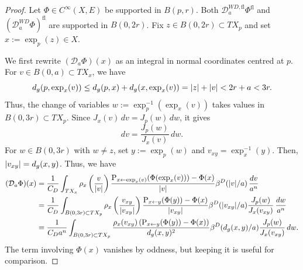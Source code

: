 \documentclass[a4paper,oneside,12pt]{amsart}
\theoremstyle{plain}
\theoremstyle{definition}
\theoremstyle{remark}
\DeclarePairedDelimiter{\abs}{\lvert}{\rvert}
\newcommand{\paralleltransport}[2]{\operatorname{P}_{#2 \gets #1}}
\newcommand{\cliffordmultiplication}{\rho}
\newcommand{\mesoscopicDiracoperator}[1][a]{\mathcal{D}_{#1}}
\newcommand{\mesoscopicWilsonDiracoperator}[1][a]{\mathcal{D}_{#1}^{\mathit{WD}}}
\newcommand{\cutoff}{\beta}
\newcommand{\cutoffDirac}{\cutoff^D}
\newcommand{\flatmesoscopicWilsonDiracoperator}[1][a]{\mathcal{D}_{#1}^{\mathit{WD},\mathrm{fl}}}
\newcommand{\flatmodel}[1]{#1^{\mathrm{fl}}}
\begin{document}
\begin{proof}
  Let $\Phi \in C^{\infty}(X,E)$ be supported in $B(p,r)$.
  Both $\flatmesoscopicWilsonDiracoperator \flatmodel{\Phi}$ and $\flatmodel{\left(\mesoscopicWilsonDiracoperator \Phi\right)}$ are supported in $B(0,2r)$.
  Fix $z \in B(0,2r) \subset TX_p$ and set $x := \exp_p(z) \in X$.

  We first rewrite $(\mesoscopicDiracoperator \Phi)(x)$ as an integral in normal coordinates centred at $p$.
  For $v \in B(0,a) \subset TX_x$, we have
  \begin{equation}
    d_g(p,\exp_x(v)) \le d_g(p,x) + d_g(x,\exp_x(v)) = \abs{z} + \abs{v} < 2r + a < 3r.
  \end{equation}
  Thus, the change of variables $w := \exp_p^{-1}(\exp_x(v))$ takes values in $B(0,3r) \subset TX_p$.
  Since $J_x(v) \,dv = J_p(w) \,dw$, it gives
  \begin{equation}
    dv = \frac{J_p(w)}{J_x(v)} \,dw.
  \end{equation}
  For $w \in B(0,3r)$ with $w \ne z$, set $y := \exp_p(w)$ and $v_{xy} = \exp_x^{-1}(y)$.
  Then, $\abs{v_{xy}} = d_g(x,y)$.
  Thus, we have
  \begin{equation}
    \begin{aligned}
    (\mesoscopicDiracoperator \Phi)(x) ={}& \frac{1}{C_D} \int_{TX_x} \cliffordmultiplication_x\left(\frac{v}{\abs{v}}\right) \frac{\paralleltransport{\exp_x(v)}{x}(\Phi(\exp_x(v))) - \Phi(x)}{\abs{v}} \cutoffDirac(\abs{v}/a) \,\frac{dv}{a^n} \\
    ={}& \frac{1}{C_D} \int_{B(0,3r) \subset TX_p} \cliffordmultiplication_x\left(\frac{v_{xy}}{\abs{v_{xy}}}\right) \frac{\paralleltransport{y}{x}(\Phi(y)) - \Phi(x)}{\abs{v_{xy}}} \cutoffDirac(\abs{v_{xy}}/a) \frac{J_p(w)}{J_x(v_{xy})} \,\frac{dw}{a^n} \\
    ={}& \frac{1}{C_D a^n} \int_{B(0,3r) \subset TX_p} \frac{\cliffordmultiplication_x(v_{xy})\left(\paralleltransport{y}{x}(\Phi(y)) - \Phi(x)\right)}{d_g(x,y)^2} \cutoffDirac(d_g(x,y)/a) \frac{J_p(w)}{J_x(v_{xy})} \,dw.
    \end{aligned}
  \end{equation}
  The term involving $\Phi(x)$ vanishes by oddness, but keeping it is useful for comparison.


\end{proof}
\end{document}
